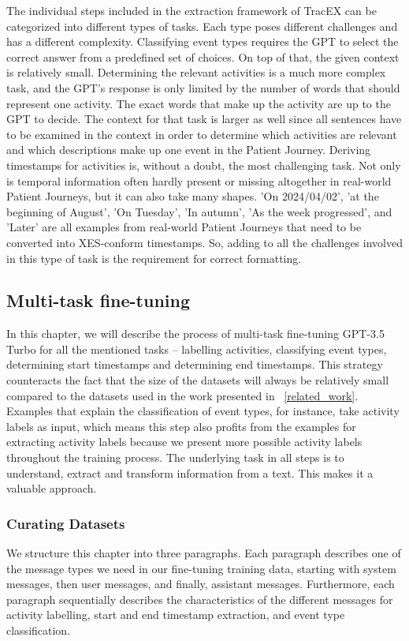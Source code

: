 The individual steps included in the extraction framework of TracEX can be categorized into different types of tasks. Each type poses different challenges and has a different complexity. Classifying event types requires the GPT to select the correct answer from a predefined set of choices. On top of that, the given context is relatively small. Determining the relevant activities is a much more complex task, and the GPT's response is only limited by the number of words that should represent one activity. The exact words that make up the activity are up to the GPT to decide. The context for that task is larger as well since all sentences have to be examined in the context in order to determine which activities are relevant and which descriptions make up one event in the Patient Journey. Deriving timestamps for activities is, without a doubt, the most challenging task. Not only is temporal information often hardly present or missing altogether in real-world Patient Journeys, but it can also take many shapes. 'On 2024/04/02', 'at the beginning of August', 'On Tuesday', 'In autumn', 'As the week progressed', and 'Later' are all examples from real-world Patient Journeys that need to be converted into XES-conform timestamps. So, adding to all the challenges involved in this type of task is the requirement for correct formatting.

\subsection{Multi-task fine-tuning}\label{sec:multi-task-ft}
In this chapter, we will describe the process of multi-task fine-tuning GPT-3.5 Turbo for all the mentioned tasks – labelling activities, classifying event types,  determining start timestamps and determining end timestamps. This strategy counteracts the fact that the size of the datasets will always be relatively small compared to the datasets used in the work presented in ~\autoref{related_work}. Examples that explain the classification of event types, for instance, take activity labels as input, which means this step also profits from the examples for extracting activity labels because we present more possible activity labels throughout the training process. The underlying task in all steps is to understand, extract and transform information from a text. This makes it a valuable approach.

\subsubsection{Curating Datasets}\label{sec:curating_data}
We structure this chapter into three paragraphs. Each paragraph describes one of the message types we need in our fine-tuning training data, starting with system messages, then user messages, and finally, assistant messages. Furthermore, each paragraph sequentially describes the characteristics of the different messages for activity labelling, start and end timestamp extraction, and event type classification.
